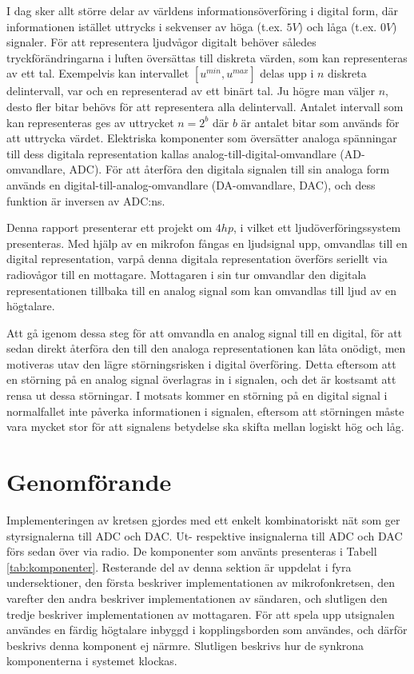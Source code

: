 \documentclass[a4paper,10pt]{article}
\begin{document}
I dag sker allt större delar av världens informationsöverföring i digital form, 
där informationen istället uttrycks i sekvenser av höga (t.ex. $5V$) och låga
(t.ex. $0V$) signaler. För att representera ljudvågor digitalt behöver således 
tryckförändringarna i luften översättas till diskreta värden, som kan 
representeras av ett tal.
Exempelvis kan intervallet $[u^{min}, u^{max}]$ delas upp i $n$ diskreta 
delintervall, var och en representerad av ett binärt tal. Ju högre man väljer
$n$, desto fler bitar behövs för att representera alla delintervall. Antalet 
intervall som kan representeras ges av uttrycket $n = 2^b$ där $b$ är antalet 
bitar som används för att uttrycka värdet. Elektriska komponenter som översätter
analoga spänningar till dess digitala representation kallas 
analog-till-digital-omvandlare (AD-omvandlare, ADC). 
För att återföra den digitala signalen till sin analoga form används en
digital-till-analog-omvandlare (DA-omvandlare, DAC), och dess funktion är
inversen av ADC:ns. 

Denna rapport presenterar ett projekt om $4 hp$, i vilket ett 
ljudöverföringssystem presenteras. Med hjälp av en mikrofon fångas en 
ljudsignal upp, omvandlas till en digital representation, varpå denna digitala 
representation överförs seriellt via radiovågor till en mottagare. Mottagaren i 
sin tur omvandlar den digitala representationen tillbaka till en analog signal 
som kan omvandlas till ljud av en högtalare.

Att gå igenom dessa steg för att omvandla en analog signal till en digital, för
att sedan direkt återföra den till den analoga representationen kan låta 
onödigt, men motiveras utav den lägre störningsrisken i digital överföring. 
Detta eftersom att en störning på en analog signal överlagras in i signalen, och
det är kostsamt att rensa ut dessa störningar. I motsats kommer en störning på
en digital signal i normalfallet inte påverka informationen i signalen, eftersom
att störningen måste vara mycket stor för att signalens betydelse ska skifta
mellan logiskt hög och låg.


\section{Genomförande}

Implementeringen av kretsen gjordes med ett enkelt kombinatoriskt nät som ger
styrsignalerna till ADC och DAC. Ut- respektive insignalerna till ADC och DAC
förs sedan över via radio. De komponenter som använts presenteras i Tabell 
\ref{tab:komponenter}. Resterande del av denna sektion är uppdelat i fyra
undersektioner, den första beskriver implementationen av mikrofonkretsen, den 
varefter den andra beskriver implementationen av sändaren, och slutligen den 
tredje beskriver implementationen av mottagaren. För att spela upp
utsignalen användes en färdig högtalare inbyggd i kopplingsborden som användes,
och därför beskrivs denna komponent ej närmre. Slutligen beskrivs hur de 
synkrona komponenterna i systemet klockas.
\end{document}
